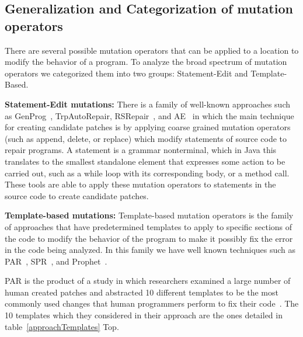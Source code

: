 \documentclass[conference]{IEEEtran}
\begin{document}
\subsection{Generalization and Categorization of mutation operators} 
\label{categorization}

There are several possible mutation operators that can be applied to a location 
to modify the behavior of a program. To analyze the broad 
spectrum of mutation operators we categorized them into two groups: 
Statement-Edit and Template-Based. 

\textbf{Statement-Edit mutations:}
There is a family of well-known approaches such as GenProg~\cite{legoues12}, 
TrpAutoRepair\cite{Qi13}, RSRepair~\cite{Qi14}, and AE~\cite{Weimer13} in which the main technique for 
creating candidate 
patches is by applying coarse grained mutation operators (such as append, delete, or 
replace) which modify statements of source code to 
repair programs. A statement is  a grammar nonterminal, which in Java this translates to the smallest standalone element that expresses 
some action to be carried out, such as a while loop with its corresponding body, or a method call. These tools are able to 
apply these mutation operators to statements in the source code to 
create candidate patches.

\textbf{Template-based mutations:}
Template-based mutation operators is the family of approaches that have 
predetermined templates to apply to specific sections of the code to 
modify the behavior of the program to make it possibly fix the error in the 
code being analyzed. In this family we have well known techniques such as PAR~\cite{kim2013}, 
SPR~\cite{fan15}, and 
Prophet~\cite{Long2016}.
 
PAR is the product of a study in which researchers examined a large number of 
human 
created patches and abstracted 10 different templates to be the most 
commonly used changes that human programmers perform to fix their 
code~\cite{kim2013}.
The 10 templates which they considered in their approach are the ones detailed in table~\ref{approachTemplates} Top.
\end{document}
